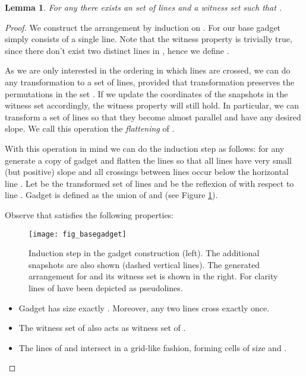 \documentclass[11pt,a4paper]{article}
\newtheorem{lemma}[theorem]{Lemma}
\begin{document}
\begin{lemma}\label{ALB:basicgad}
For any  there exists an set  of  lines and a witness set  such that .
\end{lemma}
\begin{proof}
We construct the arrangement by induction on . For  our base gadget  simply consists of a single line. Note that the witness property is trivially true, since there don't exist two distinct lines in , hence we define .

As we are only interested in the ordering in which lines are crossed, we can do any transformation to a set  of lines, provided that  transformation preserves the permutations in the set . If we update the coordinates of the snapshots in the witness set accordingly, the witness property will still hold. In particular, we can transform a set  of lines so that they become almost parallel and have any desired slope. We call this operation the {\em flattening} of .

With this operation in mind we can do the induction step as follows: for any  generate a copy of gadget  and flatten the lines so that all lines have very small (but positive) slope and all crossings between lines occur below the horizontal line . Let  be the transformed set of lines and  be the reflexion of  with respect to line . Gadget  is defined as the union of  and  (see Figure \ref{Afig_basegadget}).

Observe that  satisfies the following properties:
\begin{figure}
   \begin{center}
     \texttt{[image: fig\_basegadget]}
     \caption{Induction step in the gadget construction (left). The additional snapshots are also shown  (dashed vertical lines). The generated arrangement for  and its witness set is shown in the right. For clarity lines of  have been depicted as pseudolines.}   \label{Afig_basegadget}
   \end{center}

\end{figure}

\begin{itemize}
\item  Gadget  has size exactly . Moreover, any two lines cross exactly once.
\item  The witness set  of  also acts as witness set of .
\item  The lines of  and  intersect in a grid-like fashion, forming cells of size  and . \end{itemize}


\end{proof}
\end{document}
